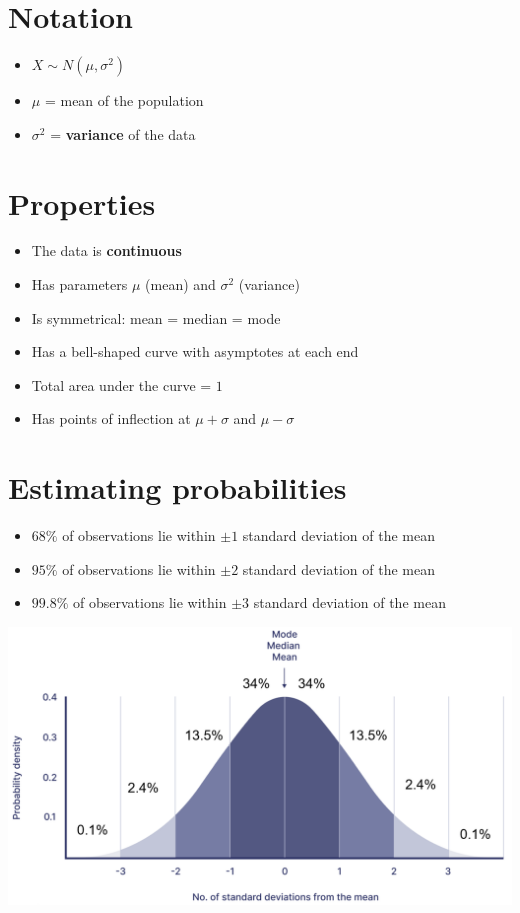 \section{Notation}
\begin{itemize}
	\item $X \sim N(\mu,\sigma^2)$
	\item $\mu$ = mean of the population
	\item $\sigma^2$ = \textbf{variance} of the data
\end{itemize}
\section{Properties}
\begin{itemize}
	\item The data is \textbf{continuous}
	\item Has parameters $\mu$ (mean) and $\sigma^2$ (variance)
	\item Is symmetrical: mean = median = mode
	\item Has a bell-shaped curve with asymptotes at each end
	\item Total area under the curve = $1$
	\item Has points of inflection at $\mu+\sigma$ and $\mu-\sigma$
\end{itemize}

\section{Estimating probabilities}
\begin{itemize}
	\item $68\%$ of observations lie within $\pm 1$ standard deviation of the mean
	\item $95\%$ of observations lie within $\pm 2$ standard deviation of the mean
	\item $99.8\%$ of observations lie within $\pm 3$ standard deviation of the mean
\end{itemize}
\includegraphics[width=0.7\linewidth]{images/normal_estimate}

